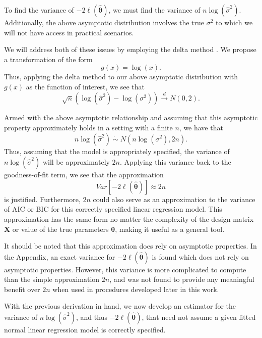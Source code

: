 \documentclass[submit]{smj}
\begin{document}
		To find the variance of $-2 \ell (\hat{\bm{\theta}}  )$, we must find the variance of $n \log(\hat{\sigma}^2)$.
		Additionally, the above asymptotic distribution involves the true $\sigma^2$ to which we will not have access in practical scenarios.

		We will address both of these issues by employing the delta method \citep{Rao}. We propose a transformation of the form
		\begin{equation*}
			g(x) = \log(x) .
		\end{equation*}
		Thus, applying the delta method to our above asymptotic distribution with $g(x)$ as the function of interest, we see that
		\begin{equation*}
			\sqrt{n} ( \log (\hat{\sigma}^2) - \log(\sigma^2)) \xrightarrow[]{d} N(0, 2) .
		\end{equation*}

		Armed with the above asymptotic relationship and assuming that this asymptotic property approximately holds in a setting with a finite $n$, we have that
		\begin{equation*}
			n\log(\hat{\sigma}^2) \; \dot\sim \; N \left( n\log(\sigma^2), 2n \right) .
		\end{equation*}
		Thus, assuming that the model is appropriately specified, the variance of $n\log(\hat{\sigma}^2)$ will be approximately $2n$. Applying this variance back to the goodness-of-fit term,
		we see that the approximation
		\begin{equation*}
			Var \left[ -2 \ell (\hat{\bm{\theta}}  ) \right] \approx 2n
		\end{equation*}
		is justified. Furthermore, $2n$ could also serve as an approximation to the variance of AIC or BIC for this correctly specified linear regression model. This approximation
		has the same form no matter the complexity of the design matrix $\bm{X}$ or value of the true parameters $\bm{\theta}$, making it useful as a
		general tool.

		It should be noted that this approximation does rely on asymptotic properties. In the Appendix, an exact variance for $-2 \ell (\hat{\bm{\theta}})$ is found which does
		not rely on asymptotic properties. However, this variance is more complicated to compute than the simple approximation $2n$, and was not found to provide any meaningful
		benefit over $2n$ when used in procedures developed later in this work.

		With the previous derivation in hand, we now develop an estimator for the variance of $n\log(\hat{\sigma}^2)$, and thus $-2 \ell (\hat{\bm{\theta}})$,
		that need not assume a given fitted normal linear regression model is correctly specified.
\end{document}

